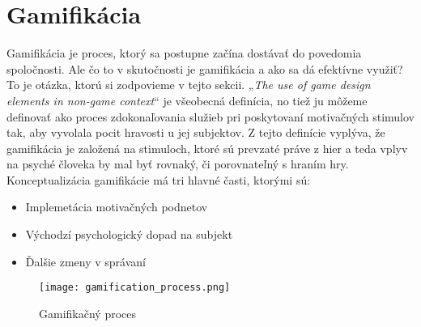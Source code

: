 \documentclass[10pt,twoside,slovak,a4paper]{coursepaper}
\begin{document}
\section{Gamifikácia}\label{Gamifikácia}

Gamifikácia je proces, ktorý sa postupne začína dostávať do povedomia spoločnosti. Ale čo to v skutočnosti je gamifikácia a ako sa dá efektívne využiť? To je otázka, ktorú si zodpovieme v tejto sekcii. „\emph{The use of game design elements in non-game context}“\cite{Gamification-quote} je všeobecná definícia, no tiež ju môžeme definovať ako proces zdokonaľovania služieb pri poskytovaní motivačných stimulov tak, aby vyvolala pocit hravosti u jej subjektov.\cite{Gamification} Z tejto definície vyplýva, že gamifikácia je založená na stimuloch, ktoré sú prevzaté práve z hier a teda vplyv na psyché človeka by mal byť rovnaký, či porovnateľný s hraním hry. Konceptualizácia gamifikácie má tri hlavné časti, ktorými sú:\cite{Gamification}


\begin{itemize}
\item Implemetácia motivačných podnetov
\item Východzí psychologický dopad na subjekt
\item Ďalšie zmeny v správaní
\end{itemize}

\begin{figure*}[tbh]
\centering
\texttt{[image: gamification\_process.png]}
\caption{Gamifikačný proces\cite{Gamification}}
\label{f:rozhod}
\end{figure*}

\end{document}
